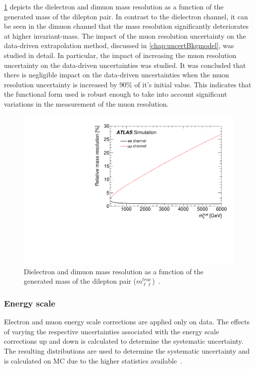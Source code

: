 \cref{fig:uncert:mass_resolution_eemm} depicts the dielectron and dimuon mass resolution as a function of the generated mass of the dilepton pair. In contrast to the dielectron channel, it can be seen in the dimuon channel that the mass resolution significantly deteriorates at higher invariant-mass. The impact of the muon resolution uncertainty on the data-driven extrapolation method, discussed in \cref{chap:uncertBkgmodel}, was studied in detail. In particular, the impact of increasing the muon resolution uncertainty on the data-driven uncertainties was studied. It was concluded that there is negligible impact on the data-driven uncertainties when the muon resolution uncertainty is increased by 90\% of it's initial value. This indicates that the functional form used is robust enough to take into account significant variations in the measurement of the muon resolution. 
\begin{figure}[!htb]
    \centering
    \includegraphics[width=\textwidth]{figures/analysis/datamc/Uncertainties/exp/figaux_15_massResolution.pdf}
    \caption[Dielectron and dimuon mass resolution as a function of the generated mass of the dilepton pair ($m_{\ell\ell}^{true}$)]{Dielectron and dimuon mass resolution as a function of the generated mass of the dilepton pair ($m_{\ell\ell}^{true}$)~\cite{Aad:2019fac}.}
    \label{fig:uncert:mass_resolution_eemm}
\end{figure}

\subsubsection{Energy scale}
Electron and muon energy scale corrections are applied only on data. The effects of varying the respective uncertainties associated with the energy scale corrections up and down is calculated to determine the systematic uncertainty. The resulting distributions are used to determine the systematic uncertainty and is calculated on MC due to the higher statistics available~\cite{Aad:2019tso}. 

